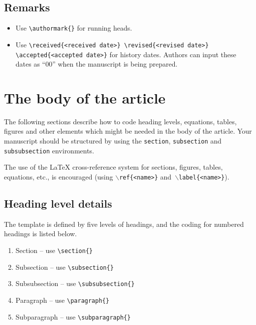 \documentclass[11pt]{article}
\begin{document}
\subsection{Remarks}
\begin{itemize}
\item Use \verb"\authormark{}" for running heads.

\item Use \verb"\received{<received date>} \revised{<revised date>} \accepted{<accepted date>}" for history dates. Authors can input these dates as ``00'' when the manuscript is being prepared.
\end{itemize}



\section{The body of the article}
\label{sec5}

The following sections describe how to code heading levels, equations, tables, f{i}gures and other elements which might be needed in the body of the article.
Your manuscript should be structured by using the \texttt{section}, \texttt{subsection} and  \texttt{subsubsection} environments.

The use of the LaTeX cross-reference system for sections, f{i}gures, tables, equations, etc., is encouraged (using
 $\backslash$\verb|ref{<name>}| and\ $\backslash$\verb|label{<name>}|).

\subsection{Heading level details}

\noindent The template is def{i}ned by f{i}ve levels of headings, and  the coding for numbered headings is listed below.
\begin{enumerate}
\item[] Section -- use \verb"\section{}"
\item[] Subsection -- use \verb"\subsection{}"
\item[] Subsubsection -- use \verb"\subsubsection{}"
\item[] Paragraph -- use \verb"\paragraph{}"
\item[] Subparagraph -- use \verb"\subparagraph{}"
\end{enumerate}
\end{document}

